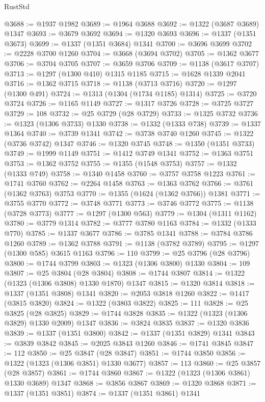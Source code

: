 \begin{lexlean}{RustStd}
\begin{coremodule}
{\begin{coremodule}
{{{{{{{{{{{{{{{{{{{{{{{{{{{{{{{{{{@3688 := @1937 @1982
@3689 := @1964 @3688
@3692 := @1322 (@3687 @3689) @1347
@3693 := @3679 @3692
@3694 := @1320 @3693
@3696 := @1337 (@1351 @3673)
@3699 := @1337 (@1351 @3684) @1341
@3700 := @3696 @3699
@3702 := @2228 @3700 @1260
@3704 := @3668 (@3694 @3702)
@3705 := @1362 @3677
@3706 := @3704 @3705
@3707 := @3659 @3706
@3709 := @1138 (@3617 @3707)
@3713 := @1297 (@1300 @410) @1315 @1185
@3715 := @1628 @1339 @2041
@3716 := @1362 @3715
@3718 := @1138 (@3713 @3716)
@3720 := @1297 (@1300 @491)
@3724 := @1313 (@1304 (@1734 @1185) @1314)
@3725 := @3720 @3724
@3726 := @1165 @1149
@3727 := @1317 @3726
@3728 := @3725 @3727
@3729 := 108
@3732 := @25 @3729 (@28 @3729)
@3733 := @1325 @3732
@3736 := @1323 (@1306 @3733) @1330
@3738 := @1332 (@1333 @738)
@3739 := @1337 @1364
@3740 := @3739 @1341
@3742 := @3738 @3740 @1260
@3745 := @1322 (@3736 @3742) @1347
@3746 := @1320 @3745
@3748 := @1350 (@1351 @3733)
@3749 := @1999 @1149
@3751 := @1412 @3749 @1341
@3752 := @1363 @3751
@3753 := @1362 @3752
@3755 := @1355 (@1548 @3753)
@3757 := @1332 (@1333 @749)
@3758 := @1340 @1458
@3760 := @3757 @3758 @1223
@3761 := @1741 @3760
@3762 := @2264 @1458
@3763 := @1363 @3762
@3766 := @3761 (@1362 @3763) @3753
@3770 := @1355 (@1624 (@1362 @3766)) @1381
@3771 := @3755 @3770
@3772 := @3748 @3771
@3773 := @3746 @3772
@3775 := @1138 (@3728 @3773)
@3777 := @1297 (@1300 @563)
@3779 := @1304 (@1311 @1162)
@3780 := @3779 @1314
@3782 := @3777 @3780 @1163
@3784 := @1332 (@1333 @770)
@3785 := @1337 @3677
@3786 := @3785 @1341
@3788 := @3784 @3786 @1260
@3789 := @1362 @3788
@3791 := @1138 (@3782 @3789)
@3795 := @1297 (@1300 @585) @3615 @1163
@3796 := 110
@3799 := @25 @3796 (@28 @3796)
@3800 := @1744 @3799
@3803 := @1323 (@1306 @3800) @1330
@3804 := 109
@3807 := @25 @3804 (@28 @3804)
@3808 := @1744 @3807
@3814 := @1322 (@1323 (@1306 @3808) @1330 @1870) @1347
@3815 := @1320 @3814
@3818 := @1337 (@1351 @3808) @1341
@3820 := @2053 @3818 @1260
@3822 := @1417 (@3815 @3820)
@3824 := @1322 (@3803 @3822)
@3825 := 111
@3828 := @25 @3825 (@28 @3825)
@3829 := @1744 @3828
@3835 := @1322 (@1323 (@1306 @3829) @1330 @2009) @1347
@3836 := @3824 @3835
@3837 := @1320 @3836
@3839 := @1337 (@1351 @3800)
@3842 := @1337 (@1351 @3829) @1341
@3843 := @3839 @3842
@3845 := @2025 @3843 @1260
@3846 := @1741 @3845
@3847 := 112
@3850 := @25 @3847 (@28 @3847)
@3851 := @1744 @3850
@3856 := @1322 (@1323 (@1306 @3851) @1330 @3677)
@3857 := 113
@3860 := @25 @3857 (@28 @3857)
@3861 := @1744 @3860
@3867 := @1322 (@1323 (@1306 @3861) @1330 @3689) @1347
@3868 := @3856 @3867
@3869 := @1320 @3868
@3871 := @1337 (@1351 @3851)
@3874 := @1337 (@1351 @3861) @1341
}}}}}}}}}}}}}}}}}}}}}}}}}}}}}}}}}}
\end{coremodule}}
\end{coremodule}
\end{lexlean}
